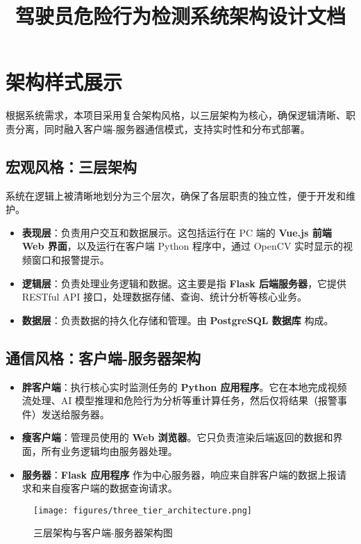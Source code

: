 \documentclass[a4paper,12pt]{article}
\title{驾驶员危险行为检测系统架构设计文档}
\author{}
\date{}
\begin{document}
\maketitle
\tableofcontents
\newpage

\section{架构样式展示}
根据系统需求，本项目采用复合架构风格，以三层架构为核心，确保逻辑清晰、职责分离，同时融入客户端-服务器通信模式，支持实时性和分布式部署。

\subsection{宏观风格：三层架构}
系统在逻辑上被清晰地划分为三个层次，确保了各层职责的独立性，便于开发和维护。
\begin{itemize}
  \item \textbf{表现层}：负责用户交互和数据展示。这包括运行在 PC 端的 \textbf{Vue.js 前端 Web 界面}，以及运行在客户端 Python 程序中，通过 OpenCV 实时显示的视频窗口和报警提示。
  \item \textbf{逻辑层}：负责处理业务逻辑和数据。这主要是指 \textbf{Flask 后端服务器}，它提供 RESTful API 接口，处理数据存储、查询、统计分析等核心业务。
  \item \textbf{数据层}：负责数据的持久化存储和管理。由 \textbf{PostgreSQL 数据库} 构成。
\end{itemize}

\subsection{通信风格：客户端-服务器架构}
\begin{itemize}
  \item \textbf{胖客户端}：执行核心实时监测任务的 \textbf{Python 应用程序}。它在本地完成视频流处理、AI 模型推理和危险行为分析等重计算任务，然后仅将结果（报警事件）发送给服务器。
  \item \textbf{瘦客户端}：管理员使用的 \textbf{Web 浏览器}。它只负责渲染后端返回的数据和界面，所有业务逻辑均由服务器处理。
  \item \textbf{服务器}：\textbf{Flask 应用程序} 作为中心服务器，响应来自胖客户端的数据上报请求和来自瘦客户端的数据查询请求。
\end{itemize}

\begin{figure}[h]
  \centering
  \texttt{[image: figures/three\_tier\_architecture.png]}
  \caption{三层架构与客户端-服务器架构图}
  \label{fig:three_tier}
\end{figure}
\end{document}
